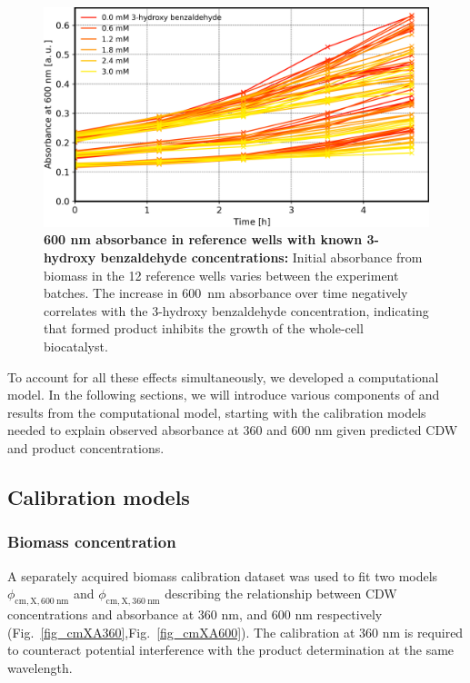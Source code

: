 \documentclass[sn-standardnature]{sn-jnl}%
\theoremstyle{thmstyleone}%
\theoremstyle{thmstyletwo}%
\theoremstyle{thmstylethree}%
\begin{document}
\begin{figure}[H]
    \centering
    \includegraphics[width=1.0\textwidth]{figures/plot_A600_kinetics.png}
    \caption{
        \textbf{600 nm absorbance in reference wells with known 3-hydroxy benzaldehyde concentrations:}
        Initial absorbance from biomass in the 12 reference wells varies between the experiment batches.
        The increase in 600~nm absorbance over time negatively correlates with the 3-hydroxy benzaldehyde concentration, indicating that formed product inhibits the growth of the whole-cell biocatalyst.
    }
    \label{fig_a600kinetics}
\end{figure}

To account for all these effects simultaneously, we developed a computational model.
In the following sections, we will introduce various components of and results from the computational model, starting with the calibration models needed to explain observed absorbance at 360 and 600 nm given predicted CDW and product concentrations.

\subsection{Calibration models}
\label{sec_calibrations}

\subsubsection{Biomass concentration}

A separately acquired biomass calibration dataset was used to fit two models $\phi_\mathrm{cm,X,600\ nm}$ and $\phi_\mathrm{cm,X,360\ nm}$ describing the relationship between CDW concentrations and absorbance at 360 nm, and 600 nm respectively (Fig.~\ref{fig_cmXA360},Fig.~\ref{fig_cmXA600}). The calibration at 360 nm is required to counteract potential interference with the product determination at the same wavelength.
\end{document}
